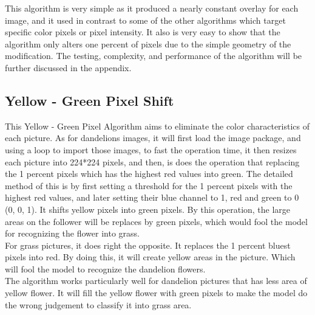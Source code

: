 \documentclass{article}
\begin{document}
This algorithm is very simple as it produced a nearly constant overlay for each image, and it used in contrast to some of the other algorithms which target specific color pixels or pixel intensity. It also is very easy to show that the algorithm only alters one percent of pixels due to the simple geometry of the modification. The testing, complexity, and performance of the algorithm will be further discussed in the appendix.

\subsection{Yellow - Green Pixel Shift}
\vspace{0.1in}
This Yellow - Green Pixel Algorithm aims to eliminate the color characteristics of each picture. As for dandelions images, it will first load the image package, and using a loop to import those images, to fast the operation time, it then resizes each picture into 224*224 pixels, and then, is does the operation that replacing the 1 percent pixels which has the highest red values into green. The detailed method of this is by first setting a threshold for the 1 percent pixels with the highest red values, and later setting their blue channel to 1, red and green to 0 (0, 0, 1). It shifts yellow pixels into green pixels. By this operation, the large areas on the follower will be replaces by green pixels, which would fool the model for recognizing the flower into grass. 
\vspace{0.15in}
\\For grass pictures, it does right the opposite. It replaces the 1 percent bluest pixels into red. By doing this, it will create yellow areas in the picture. Which will fool the model to recognize the dandelion flowers. 
\vspace{0.2in}
\\The algorithm works particularly well for dandelion pictures that has less area of yellow flower. It will fill the yellow flower with green pixels to make the model do the wrong judgement to classify it into grass area.
\end{document}
